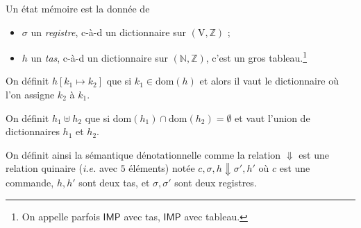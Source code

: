 \documentclass[../main]{subfiles}
\begin{document}
  \begin{defn}
    Un état mémoire est la donnée de 
    \begin{itemize}
      \item $\sigma$ un \textit{registre}, c-à-d un dictionnaire sur $(\mathrm{V}, \mathds{Z})$ ;
      \item $h$ un \textit{tas}, c-à-d un dictionnaire sur $(\mathds{N}, \mathds{Z})$, c'est un gros tableau.\footnote{On appelle parfois $\mathsf{IMP}$ avec tas, $\mathsf{IMP}$ avec tableau.}
    \end{itemize}

    On définit $h[k_1 \mapsto k_2]$ que si $k_1 \in \mathrm{dom}(h)$ et alors il vaut le dictionnaire où l'on assigne $k_2$ à $k_1$.
    
    On définit $h_1 \uplus h_2$ que si $\mathrm{dom}(h_1) \cap \mathrm{dom}(h_2) = \emptyset$ et vaut l'union de dictionnaires $h_1$ et $h_2$.
  \end{defn}

  On définit ainsi la sémantique dénotationnelle comme la relation ${\Downarrow}$ est une relation quinaire (\textit{i.e.} avec $5$ éléments) notée $c, \sigma, h \Downarrow \sigma', h'$ où  $c$ est une commande, $h,h'$ sont deux tas, et $\sigma, \sigma'$ sont deux registres.
\end{document}
